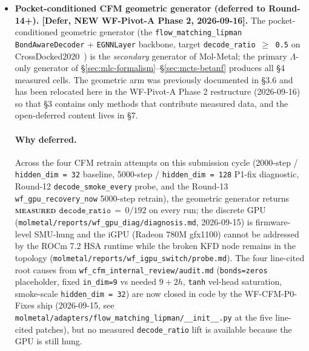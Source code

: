 \begin{itemize}
  \item \textbf{Pocket-conditioned CFM geometric generator
    (deferred to Round-14+). [Defer, NEW WF-Pivot-A Phase 2,
    2026-09-16].}\label{sec:future:cfm-deferred}
    The pocket-conditioned geometric generator (the
    \texttt{flow\_matching\_lipman} \texttt{BondAwareDecoder} +
    \texttt{EGNNLayer} backbone, target
    \texttt{decode\_ratio\,$\geq$\,0.5} on
    CrossDocked2020~\cite{luo2021crossdocked}) is the
    \emph{secondary} generator of Mol-Metal; the primary
    $\Lambda$-only generator of
    \S\ref{sec:mlc-formalism}--\S\ref{sec:mcts-betanf} produces
    all \S4 measured cells. The geometric arm was previously
    documented in \S3.6 and has been relocated here in the
    WF-Pivot-A Phase 2 restructure (2026-09-16) so that
    \S3 contains only methods that contribute measured data,
    and the open-deferred content lives in \S7.

    \paragraph{Why deferred.}
    Across the four CFM retrain attempts on this submission
    cycle (2000-step / \texttt{hidden\_dim\,=\,32} baseline,
    5000-step / \texttt{hidden\_dim\,=\,128} P1-fix diagnostic,
    Round-12 \texttt{decode\_smoke\_every} probe, and the
    Round-13 \texttt{wf\_gpu\_recovery\_now} 5000-step retrain),
    the geometric generator returns
    \textbf{\textsc{measured} $\texttt{decode\_ratio}\,=\,0/192$}
    on every run; the discrete GPU
    (\texttt{molmetal/reports/wf\_gpu\_diag/diagnosis.md},
    2026-09-15) is firmware-level SMU-hung and the iGPU
    (Radeon 780M gfx1100) cannot be addressed by the ROCm 7.2
    HSA runtime while the broken KFD node remains in the
    topology (\texttt{molmetal/reports/wf\_igpu\_switch/probe.md}).
    The four line-cited root causes from
    \texttt{wf\_cfm\_internal\_review/audit.md}
    (\texttt{bonds=zeros} placeholder, fixed
    \texttt{in\_dim=9} vs needed $9+2h$, \texttt{tanh}
    vel-head saturation, smoke-scale \texttt{hidden\_dim\,=\,32})
    are now closed in code by the WF-CFM-P0-Fixes ship
    (2026-09-15, see \texttt{molmetal/adapters/flow\_matching\_lipman/\_\_init\_\_.py}
    at the five line-cited patches), but no measured
    \texttt{decode\_ratio} lift is available because the GPU
    is still hung.


\end{itemize}
